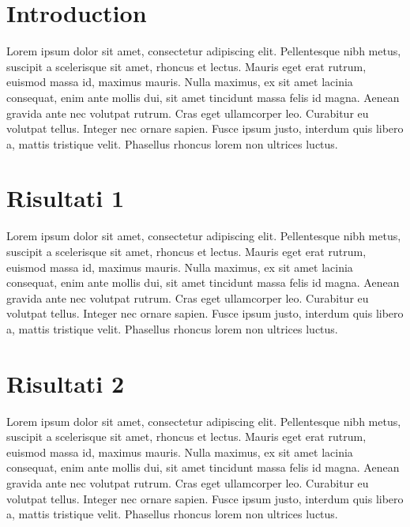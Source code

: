 

\label{chap:results}

\section{Introduction}\label{sec:introduction}
Lorem ipsum dolor sit amet, consectetur adipiscing elit. Pellentesque nibh metus, suscipit a scelerisque sit amet, rhoncus et lectus. Mauris eget erat rutrum, euismod massa id, maximus mauris. Nulla maximus, ex sit amet lacinia consequat, enim ante mollis dui, sit amet tincidunt massa felis id magna. Aenean gravida ante nec volutpat rutrum. Cras eget ullamcorper leo. Curabitur eu volutpat tellus. Integer nec ornare sapien. Fusce ipsum justo, interdum quis libero a, mattis tristique velit. Phasellus rhoncus lorem non ultrices luctus.

\section{Risultati 1}\label{sec:risultati1}
Lorem ipsum dolor sit amet, consectetur adipiscing elit. Pellentesque nibh metus, suscipit a scelerisque sit amet, rhoncus et lectus. Mauris eget erat rutrum, euismod massa id, maximus mauris. Nulla maximus, ex sit amet lacinia consequat, enim ante mollis dui, sit amet tincidunt massa felis id magna. Aenean gravida ante nec volutpat rutrum. Cras eget ullamcorper leo. Curabitur eu volutpat tellus. Integer nec ornare sapien. Fusce ipsum justo, interdum quis libero a, mattis tristique velit. Phasellus rhoncus lorem non ultrices luctus.

\section{Risultati 2}\label{sec:risultati2}
Lorem ipsum dolor sit amet, consectetur adipiscing elit. Pellentesque nibh metus, suscipit a scelerisque sit amet, rhoncus et lectus. Mauris eget erat rutrum, euismod massa id, maximus mauris. Nulla maximus, ex sit amet lacinia consequat, enim ante mollis dui, sit amet tincidunt massa felis id magna. Aenean gravida ante nec volutpat rutrum. Cras eget ullamcorper leo. Curabitur eu volutpat tellus. Integer nec ornare sapien. Fusce ipsum justo, interdum quis libero a, mattis tristique velit. Phasellus rhoncus lorem non ultrices luctus.

